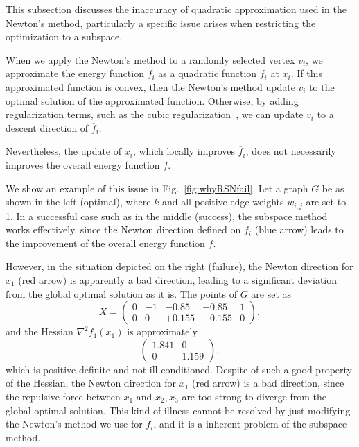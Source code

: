 \documentclass[dvipdfmx,journal]{IEEEtran}
\begin{document}
This subsection discusses the inaccuracy of quadratic approximation used in the Newton's method, particularly a specific issue arises when restricting the optimization to a subspace.

When we apply the Newton's method to a randomly selected vertex $v_i$, we approximate the energy function $f_i$ as a quadratic function $\overline{f}_i$ at $x_i$.
If this approximated function is convex, then the Newton's method update $v_i$ to the optimal solution of the approximated function.
Otherwise, by adding regularization terms, such as the cubic regularization~\cite{nesterovCubicRegularizationNewton2006}, we can update $v_i$ to a descent direction of $\overline{f}_i$.

Nevertheless, the update of $x_i$, which locally improves $\overline{f}_i$, does not necessarily improves the overall energy function $f$.

We show an example of this issue in Fig.~\ref{fig:whyRSNfail}.
Let a graph $G$ be as shown in the left (optimal), where $k$ and all positive edge weights $w_{i,j}$ are set to 1.
In a successful case such as in the middle (success), the subspace method works effectively, since the Newton direction defined on $f_i$ (blue arrow) leads to the improvement of the overall energy function $f$.

However, in the situation depicted on the right (failure), the Newton direction for $x_1$ (red arrow) is apparently a bad direction, leading to a significant deviation from the global optimal solution as it is.
The points of $G$ are set as
\begin{equation*}
  X = \begin{pmatrix}
    0 & -1 & -0.85  & -0.85  & 1 \\
    0 & 0  & +0.155 & -0.155 & 0
  \end{pmatrix},
\end{equation*}
and the Hessian $\nabla^2 f_1(x_1)$ is approximately
\begin{equation*}
  \begin{pmatrix}
    1.841 & 0     \\
    0     & 1.159
  \end{pmatrix},
\end{equation*}
which is positive definite and not ill-conditioned.
Despite of such a good property of the Hessian, the Newton direction for $x_1$ (red arrow) is a bad direction, since the repulsive force between $x_1$ and $x_2,x_3$ are too strong to diverge from the global optimal solution.
This kind of illness cannot be resolved by just modifying the Newton's method we use for $f_i$, and it is a inherent problem of the subspace method.
\end{document}
